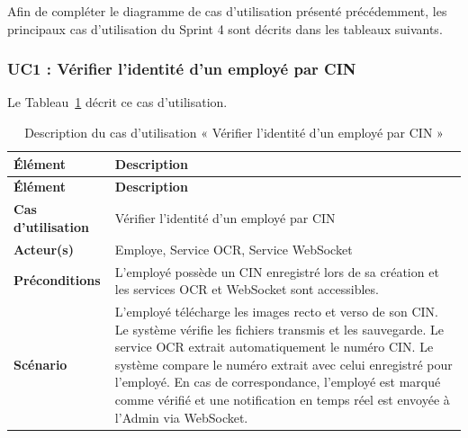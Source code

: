 Afin de compléter le diagramme de cas d'utilisation présenté précédemment,
les principaux cas d'utilisation du Sprint 4 sont décrits dans les tableaux suivants.



\subsubsection{UC1 : Vérifier l'identité d'un employé par CIN}
Le Tableau~\ref{tab:uc1-verification-cin} décrit ce cas d'utilisation.

\begin{longtable}{|>{\RaggedRight\arraybackslash}p{4cm}|>{\RaggedRight\arraybackslash}p{10.5cm}|}
\caption{Description du cas d'utilisation « Vérifier l'identité d'un employé par CIN »}
\label{tab:uc1-verification-cin}\\

\hline

\textbf{Élément} & \textbf{Description} \\

\hline

\endfirsthead

\hline

\textbf{Élément} & \textbf{Description} \\

\hline

\endhead

\textbf{Cas d'utilisation} &
Vérifier l'identité d'un employé par CIN \\

\hline

\textbf{Acteur(s)} &
Employe, Service OCR, Service WebSocket \\

\hline

\textbf{Préconditions} &
L'employé possède un CIN enregistré lors de sa création et les services OCR et WebSocket sont accessibles. \\

\hline

\textbf{Scénario} &
L'employé télécharge les images recto et verso de son CIN. Le système vérifie les fichiers transmis et les sauvegarde. Le service OCR extrait automatiquement le numéro CIN. Le système compare le numéro extrait avec celui enregistré pour l'employé. En cas de correspondance, l'employé est marqué comme vérifié et une notification en temps réel est envoyée à l'Admin via WebSocket. \\


\end{longtable}
